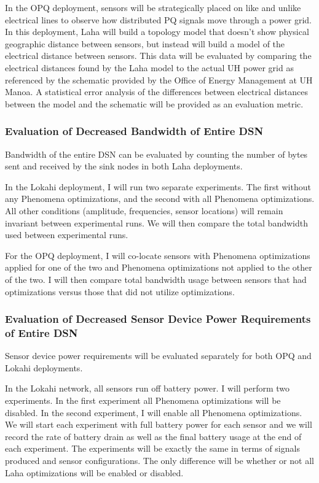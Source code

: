 In the OPQ deployment, sensors will be strategically placed on like and unlike electrical lines to observe how distributed PQ signals move through a power grid. In this deployment, Laha will build a topology model that doesn't show physical geographic distance between sensors, but instead will build a model of the electrical distance between sensors. This data will be evaluated by comparing the electrical distances found by the Laha model to the actual UH power grid as referenced by the schematic provided by the Office of Energy Management at UH Manoa. A statistical error analysis of the differences between electrical distances between the model and the schematic will be provided as an evaluation metric.

\subsubsection{Evaluation of Decreased Bandwidth of Entire DSN}
Bandwidth of the entire DSN can be evaluated by counting the number of bytes sent and received by the sink nodes in both Laha deployments. 

In the Lokahi deployment, I will run two separate experiments. The first without any Phenomena optimizations, and the second with all Phenomena optimizations. All other conditions (amplitude, frequencies, sensor locations) will remain invariant between experimental runs. We will then compare the total bandwidth used between experimental runs.

For the OPQ deployment, I will co-locate sensors with Phenomena optimizations applied for one of the two and Phenomena optimizations not applied to the other of the two. I will then compare total bandwidth usage between sensors that had optimizations versus those that did not utilize optimizations.

\subsubsection{Evaluation of Decreased Sensor Device Power Requirements of Entire DSN}
Sensor device power requirements will be evaluated separately for both OPQ and Lokahi deployments. 

In the Lokahi network, all sensors run off battery power. I will perform two experiments. In the first experiment all Phenomena optimizations will be disabled. In the second experiment, I will enable all Phenomena optimizations. We will start each experiment with full battery power for each sensor and we will record the rate of battery drain as well as the final battery usage at the end of each experiment. The experiments will be exactly the same in terms of signals produced and sensor configurations. The only difference will be whether or not all Laha optimizations will be enabled or disabled. 

